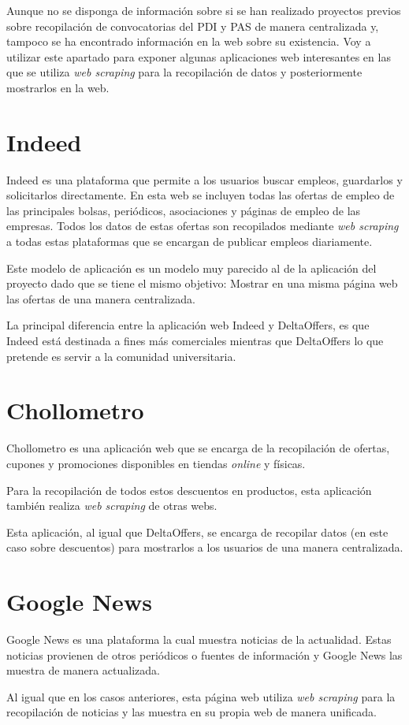 
Aunque no se disponga de información sobre si se han realizado proyectos previos sobre recopilación de convocatorias del PDI y PAS de manera centralizada y, tampoco se ha encontrado información en la web sobre su existencia. Voy a utilizar este apartado para exponer algunas aplicaciones web interesantes en las que se utiliza \textit{web scraping} para la recopilación de datos y posteriormente mostrarlos en la web.

\section{Indeed}
Indeed es una plataforma que permite a los usuarios buscar empleos, guardarlos y solicitarlos directamente. En esta web se incluyen todas las ofertas de empleo de las principales bolsas, periódicos, asociaciones y páginas de empleo de las empresas. Todos los datos de estas ofertas son recopilados mediante \textit{web scraping} a todas estas plataformas que se encargan de publicar empleos diariamente.

Este modelo de aplicación es un modelo muy parecido al de la aplicación del proyecto dado que se tiene el mismo objetivo: Mostrar en una misma página web las ofertas de una manera centralizada. 

La principal diferencia entre la aplicación web Indeed y DeltaOffers, es que Indeed está destinada a fines más comerciales mientras que DeltaOffers lo que pretende es servir a la comunidad universitaria.

\section{Chollometro}
Chollometro es una aplicación web que se encarga de la recopilación de ofertas, cupones y promociones disponibles en tiendas \textit{online} y físicas.

Para la recopilación de todos estos descuentos en productos, esta aplicación también realiza \textit{web scraping} de otras webs. 

Esta aplicación, al igual que DeltaOffers, se encarga de recopilar datos (en este caso sobre descuentos) para mostrarlos a los usuarios de una manera centralizada.

\section{Google News}
Google News es una plataforma la cual muestra noticias de la actualidad. Estas noticias provienen de otros periódicos o fuentes de información y Google News las muestra de manera actualizada.

Al igual que en los casos anteriores, esta página web utiliza \textit{web scraping} para la recopilación de noticias y las muestra en su propia web de manera unificada.
